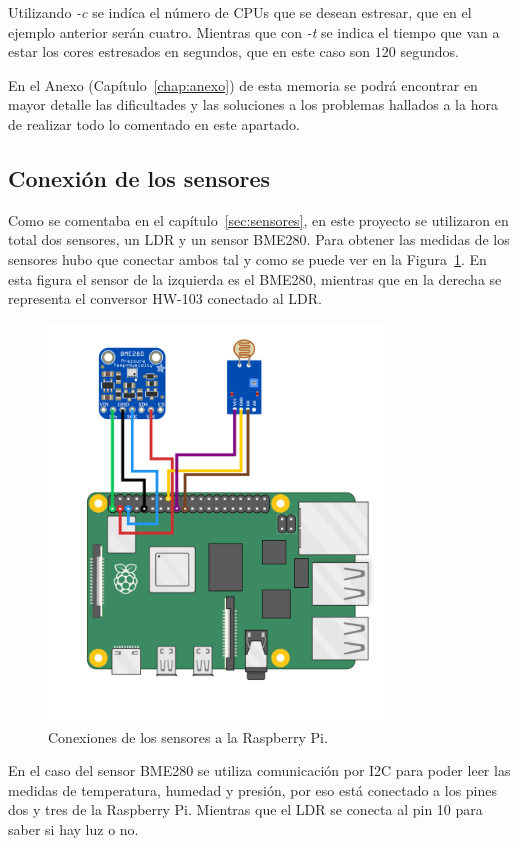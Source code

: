\documentclass[a4paper, 12pt]{book}
\begin{document}
Utilizando \textit{-c} se indíca el número de CPUs que se desean estresar, que en el ejemplo anterior serán cuatro. Mientras que con \textit{-t} se indica el tiempo que van a estar los cores estresados en segundos, que en este caso son $120$ segundos.

En el Anexo (Capítulo~\ref{chap:anexo}) de esta memoria se podrá encontrar en mayor detalle las dificultades y las soluciones a los problemas hallados a la hora de realizar todo lo comentado en este apartado.


\subsection{Conexión de los sensores}
\label{subsec:conexion_sensores}

Como se comentaba en el capítulo~\ref{sec:sensores}, en este proyecto se utilizaron en total dos sensores, un LDR y un sensor BME280. Para obtener las medidas de los sensores hubo que conectar ambos tal y como se puede ver en la Figura~\ref{fig:circuito}. En esta figura el sensor de la izquierda es el BME280, mientras que en la derecha se representa el conversor HW-103 conectado al LDR.

\begin{figure}[htb]
  \centering
  \includegraphics[width=9cm, keepaspectratio]{img/circuito.png}
  \caption{Conexiones de los sensores a la Raspberry Pi.}\label{fig:circuito}
\end{figure}

En el caso del sensor BME280 se utiliza comunicación por I2C para poder leer las medidas de temperatura, humedad y presión, por eso está conectado a los pines dos y tres de la Raspberry Pi. Mientras que el LDR se conecta al pin 10 para saber si hay luz o no.
\end{document}
